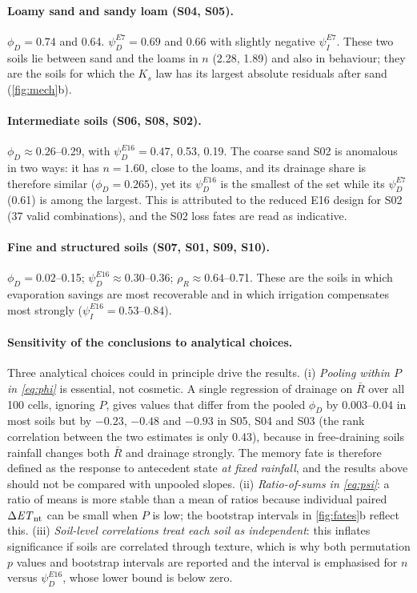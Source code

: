 \paragraph{Loamy sand and sandy loam (S04, S05).} $\phi_D=0.74$ and 0.64. $\psi_D^{E7}=0.69$ and 0.66 with slightly negative $\psi_I^{E7}$. These two soils lie between sand and the loams in $n$ (2.28, 1.89) and also in behaviour; they are the soils for which the $K_s$ law has its largest absolute residuals after sand (\cref{fig:mech}b).
\paragraph{Intermediate soils (S06, S08, S02).} $\phi_D\approx0.26$--0.29, with $\psi_D^{E16}=0.47$, 0.53, 0.19. The coarse sand S02 is anomalous in two ways: it has $n=1.60$, close to the loams, and its drainage share is therefore similar ($\phi_D=0.265$), yet its $\psi_D^{E16}$ is the smallest of the set while its $\psi_D^{E7}$ (0.61) is among the largest. This is attributed to the reduced E16 design for S02 (37 valid combinations), and the S02 loss fates are read as indicative.
\paragraph{Fine and structured soils (S07, S01, S09, S10).} $\phi_D=0.02$--0.15; $\psi_D^{E16}\approx0.30$--0.36; $\rho_R\approx0.64$--0.71. These are the soils in which evaporation savings are most recoverable and in which irrigation compensates most strongly ($\psi_I^{E16}=0.53$--0.84).

\paragraph{Sensitivity of the conclusions to analytical choices.}
Three analytical choices could in principle drive the results. (i) \emph{Pooling within $P$ in \cref{eq:phi}} is essential, not cosmetic. A single regression of drainage on $\bar R$ over all 100 cells, ignoring $P$, gives values that differ from the pooled $\phi_D$ by 0.003--0.04 in most soils but by $-0.23$, $-0.48$ and $-0.93$ in S05, S04 and S03 (the rank correlation between the two estimates is only 0.43), because in free-draining soils rainfall changes both $\bar R$ and drainage strongly. The memory fate is therefore defined as the response to antecedent state \emph{at fixed rainfall}, and the results above should not be compared with unpooled slopes. (ii) \emph{Ratio-of-sums in \cref{eq:psi}}: a ratio of means is more stable than a mean of ratios because individual paired $\Delta\mathit{ET}_{\mathrm{nt}}$ can be small when $P$ is low; the bootstrap intervals in \cref{fig:fates}b reflect this. (iii) \emph{Soil-level correlations treat each soil as independent}: this inflates significance if soils are correlated through texture, which is why both permutation $p$ values and bootstrap intervals are reported and the interval is emphasised for $n$ versus $\psi_D^{E16}$, whose lower bound is below zero.

